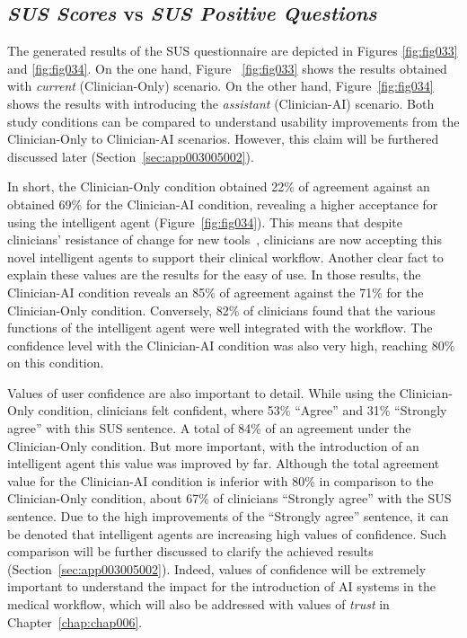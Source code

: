 \subsection{{\it SUS Scores} vs {\it SUS Positive Questions}}
\label{sec:app003004001}

The generated results of the \ac{SUS} questionnaire are depicted in Figures \ref{fig:fig033} and \ref{fig:fig034}.
On the one hand, Figure ~\ref{fig:fig033} shows the results obtained with
{\it current} (Clinician-Only) scenario.
On the other hand, Figure~\ref{fig:fig034} shows the results with introducing the {\it assistant} (Clinician-AI) scenario.
Both study conditions can be compared to understand usability improvements from the Clinician-Only to Clinician-AI scenarios.
However, this claim will be furthered discussed later (Section~\ref{sec:app003005002}).

In short, the Clinician-Only condition obtained 22\% of agreement against an obtained 69\% for the Clinician-AI condition, revealing a higher acceptance for using the intelligent agent (Figure~\ref{fig:fig034}).
This means that despite clinicians' resistance of change for new tools~\cite{10.1145/3132272.3134111}, clinicians are now accepting this novel intelligent agents to support their clinical workflow.
Another clear fact to explain these values are the results for the easy of use.
In those results, the Clinician-AI condition reveals an 85\% of agreement against the 71\% for the Clinician-Only condition.
Conversely, 82\% of clinicians found that the various functions of the intelligent agent were well integrated with the workflow.
The confidence level with the Clinician-AI condition was also very high, reaching 80\% on this condition.

Values of user confidence are also important to detail.
While using the Clinician-Only condition, clinicians felt confident, where 53\% ``Agree'' and 31\% ``Strongly agree'' with this \ac{SUS} sentence.
A total of 84\% of an agreement under the Clinician-Only condition.
But more important, with the introduction of an intelligent agent this value was improved by far.
Although the total agreement value for the Clinician-AI condition is inferior with 80\% in comparison to the Clinician-Only condition, about 67\% of clinicians ``Strongly agree'' with the \ac{SUS} sentence.
Due to the high improvements of the ``Strongly agree'' sentence, it can be denoted that intelligent agents are increasing high values of confidence.
Such comparison will be further discussed to clarify the achieved results (Section~\ref{sec:app003005002}).
Indeed, values of confidence will be extremely important to understand the impact for the introduction of \ac{AI} systems in the medical workflow, which will also be addressed with values of {\it trust} in Chapter~\ref{chap:chap006}.

